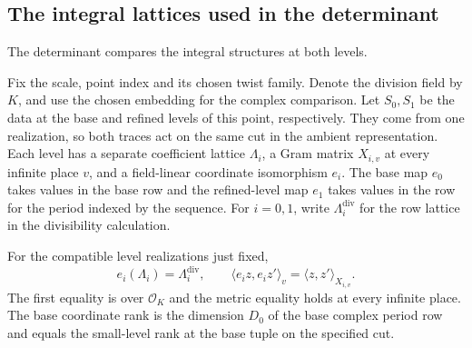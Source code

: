 \subsection{The integral lattices used in the determinant}
\label{subsec:division-level-pins}

The determinant compares the integral structures at both levels.

Fix the scale, point index and its chosen twist family. Denote
the division field by \(K\), and use the chosen embedding for
the complex comparison. Let \(S_0,S_1\) be the data at the
base and refined levels of this point, respectively. They come from one realization, so both traces act on the same cut in the ambient representation. Each level
has a separate coefficient lattice \(\Lambda_i\), a Gram
matrix \(X_{i,v}\) at every infinite place \(v\), and a
field-linear coordinate isomorphism \(e_i\). The base map
\(e_0\) takes values in the base row and the refined-level map
\(e_1\) takes values in the row for the period indexed by the
sequence. For \(i=0,1\), write \(\Lambda_i^{\mathrm{div}}\)
for the row lattice in the divisibility calculation.

\begin{proposition}\label{prop:division-level-compatibility}
For the compatible level realizations just fixed,
\[
    e_i(\Lambda_i)=\Lambda_i^{\mathrm{div}},\qquad
    \langle e_i z,e_i z'\rangle_v=\langle z,z'\rangle_{X_{i,v}}.
\]
The first equality is over \(\mathcal O_K\) and the metric equality
holds at every infinite place. The base coordinate rank is
the dimension \(D_0\) of the base complex period row and equals
the small-level rank at the base tuple on the specified cut.
\end{proposition}

